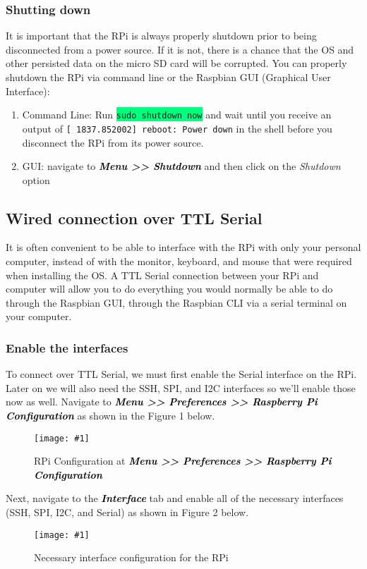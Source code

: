 \documentclass{article}
\newcommand{\codei}[1]{\colorbox{SpringGreen}{\texttt{#1}}} %
\newcommand{\outputi}[1]{\colorbox{light-gray}{\texttt{#1}}} %
\newcommand{\red}[1]{\textcolor{BrickRed}{#1}} %
\newcommand{\loc}[1]{\textit{\textcolor{Black}{\textbf{#1}}}} %
\newcommand{\imagefig}[2]{
    \begin{figure}[H]
        \centering
        \texttt{[image: \#1]}
        \caption{#2}
    \end{figure}
}
\begin{document}
    \subsubsection{Shutting down}
    \label{sec:shutting-down}
    It is important that the RPi is always properly shutdown prior to being disconnected from a power source. If it is not, there is a chance that the OS and other persisted data on the micro SD card will be corrupted. You can properly shutdown the RPi via command line or the Raspbian GUI (Graphical User Interface):
      \begin{enumerate}
        \item Command Line: Run \codei{sudo shutdown now} and wait until you receive an output of \newline\outputi{[ \red{1837.852002}] reboot: Power down} in the shell before you disconnect the RPi from its power source.
        \item GUI: navigate to \loc{Menu >> Shutdown} and then click on the \textit{Shutdown} option
      \end{enumerate}

  \subsection{Wired connection over TTL Serial}
    \label{sec:connect-serial}
    It is often convenient to be able to interface with the RPi with only your personal computer, instead of with the monitor, keyboard, and mouse that were required when installing the OS. A TTL Serial connection between your RPi and computer will allow you to do everything you would normally be able to do through the Raspbian GUI, through the Raspbian CLI via a serial terminal on your computer.
    \subsubsection{Enable the interfaces}
    To connect over TTL Serial, we must first enable the Serial interface on the RPi. Later on we will also need the SSH, SPI, and I2C interfaces so we'll enable those now as well. Navigate to \loc{Menu >> Preferences >> Raspberry Pi Configuration} as shown in the Figure 1 below.

    \imagefig{screen1.png}{RPi Configuration at \loc{Menu >> Preferences >> Raspberry Pi Configuration}}

    Next, navigate to the \loc{Interface} tab and enable all of the necessary interfaces (SSH, SPI, I2C, and Serial) as shown in Figure 2 below.
    \imagefig{screen2.png}{Necessary interface configuration for the RPi}
\end{document}
